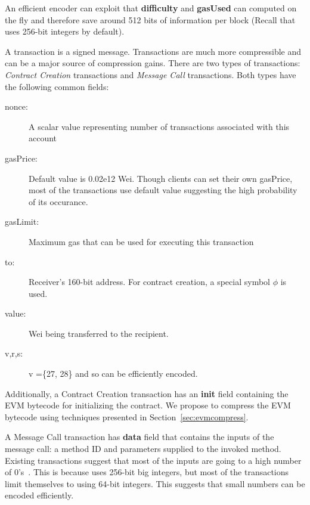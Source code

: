 An efficient encoder can exploit that \textbf{difficulty} and \textbf{gasUsed} can computed on the fly and therefore save around 512 bits of information per block (Recall that \eth{} uses 256-bit integers by default).  


A transaction is a signed message. 
Transactions are much more compressible and can be a major source of compression gains.
There are two types of transactions: {\em Contract Creation} transactions and {\em Message Call} transactions.
Both types have the following common fields:
\begin{description}
  \item[nonce:] A scalar value representing number of transactions associated with this account
  \item[gasPrice:] Default value is 0.02e12 Wei. Though clients can set their own gasPrice, most of the transactions use default value suggesting the high probability of its occurance.
  \item[gasLimit:] Maximum gas that can be used for executing this transaction
  \item[to:] Receiver's 160-bit address. For contract creation, a special symbol $\phi$ is used.
  \item[value:] Wei being transferred to the recipient.
  \item[v,r,s:] v =\{27, 28\} and so can be efficiently encoded.
\end{description}

Additionally, a Contract Creation transaction has an \textbf{init} field containing the EVM bytecode for initializing the contract.
We propose to compress the EVM bytecode using techniques presented in Section~\ref{sec:evmcompress}.

A Message Call transaction has \textbf{data} field that contains the inputs of the message call: a method ID and parameters supplied to the invoked method.
Existing transactions suggest that most of the inputs are going to a high number of 0's~\cite{ethtx}. 
This is because \eth{} uses 256-bit big integers, but most of the transactions limit themselves to using 64-bit integers.
This suggests that small numbers can be encoded efficiently.


%

